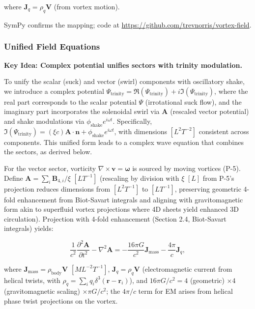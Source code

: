 where $\mathbf{J}_q = \rho_q \mathbf{V}$ (from vortex motion).

SymPy confirms the mapping; code at \url{https://github.com/trevnorris/vortex-field}.

\subsubsection{Unified Field Equations}

\textbf{Key Idea: Complex potential unifies sectors with trinity modulation.}

To unify the scalar (suck) and vector (swirl) components with oscillatory shake, we introduce a complex potential $\Psi_{\text{trinity}} = \Re(\Psi_{\text{trinity}}) + i \Im(\Psi_{\text{trinity}})$, where the real part corresponds to the scalar potential $\Psi$ (irrotational suck flow), and the imaginary part incorporates the solenoidal swirl via $\mathbf{A}$ (rescaled vector potential) and shake modulations via $\phi_{\text{shake}} e^{i \omega t}$. Specifically, $\Im(\Psi_{\text{trinity}}) = (\xi c) \mathbf{A} \cdot \mathbf{n} + \phi_{\text{shake}} e^{i \omega t}$, with dimensions $[L^2 T^{-2}]$ consistent across components. This unified form leads to a complex wave equation that combines the sectors, as derived below.

For the vector sector, vorticity $\nabla \times \mathbf{v} = \boldsymbol{\omega}$ is sourced by moving vortices (P-5). Define $\mathbf{A} = \sum_i \mathbf{B}_{4,i} / \xi$ $[L T^{-1}]$ (rescaling by division with $\xi$ $[L]$ from P-5's projection reduces dimensions from $[L^2 T^{-1}]$ to $[L T^{-1}]$, preserving geometric 4-fold enhancement from Biot-Savart integrals and aligning with gravitomagnetic form akin to superfluid vortex projections where 4D sheets yield enhanced 3D circulation). Projection with 4-fold enhancement (Section 2.4, Biot-Savart integrals) yields:

\begin{equation}
\frac{1}{c^2} \frac{\partial^2 \mathbf{A}}{\partial t^2} - \nabla^2 \mathbf{A} = -\frac{16\pi G}{c^2} \mathbf{J}_{\text{mass}} - \frac{4\pi}{c} \mathbf{J}_q,
\end{equation}

where $\mathbf{J}_{\text{mass}} = \rho_{\text{body}} \mathbf{V}$ $[M L^{-2} T^{-1}]$, $\mathbf{J}_q = \rho_q \mathbf{V}$ (electromagnetic current from helical twists, with $\rho_q = \sum_i q_i \delta^3(\mathbf{r} - \mathbf{r}_i)$), and $16\pi G/c^2 = 4$ (geometric) $\times 4$ (gravitomagnetic scaling) $\times \pi G/c^2$; the $4\pi/c$ term for EM arises from helical phase twist projections on the vortex.

